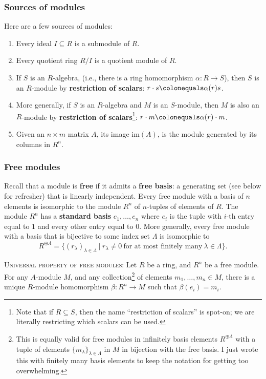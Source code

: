 \documentclass[12pt]{amsart}
\newcommand{\0}{$\phantom{.}$}
\newcommand{\1}{\mathbbm{1}}
\newcommand\ceq{\colonequals}
\newcommand{\sssec}[1]{\subsubsection*{#1}}
\begin{document}
\vspace{-1.5mm}

\sssec{Sources of modules} Here are a few sources of modules:
\begin{enumerate}
\item Every ideal $I\subseteq R$ is a submodule of $R$.
\item Every quotient ring $R/I$ is a quotient module of $R$.
\item If $S$ is an $R$-algebra, (i.e., there is a ring homomorphism $\alpha: R\to S$), then $S$ is an $R$-module by \textbf{restriction of scalars}:
$r \cdot s \ceq \alpha(r) s$.
\item More generally, if $S$ is an $R$-algebra and $M$ is an $S$-module, then $M$ is also an $R$-module by \textbf{restriction of scalars}\footnote{Note that if $R\subseteq S$, then the name ``restriction of scalars''
is spot-on; we are literally restricting which scalars can be used.}: $r \cdot m \ceq \alpha(r) \cdot m$.
\item Given an $n\times m$ matrix $A$, its image $\mathrm{im}(A)$, is the module generated by its columns in $R^n$.
\end{enumerate}



\sssec{Free modules} Recall that a module is \textbf{free} if it admits a \textbf{free basis}: a generating set (see below for refresher) that is linearly independent. Every free module with a basis of $n$ elements is isomorphic to the module $R^n$ of $n$-tuples of elements of $R$. The module $R^n$ has a \textbf{standard basis} $e_1,\dots,e_n$ where $e_i$ is the tuple with $i$-th entry equal to $1$ and every other entry equal to $0$. More generally, every free module with a basis that is bijective to some index set $\Lambda$ is isomorphic to 
\[ R^{\oplus \Lambda} = \{ (r_\lambda)_{\lambda\in\Lambda} \ | \ r_\lambda\neq 0 \ \text{for at most finitely many} \ \lambda\in\Lambda\}.\]

\noindent \textsc{Universal property of free modules:} Let $R$ be a ring, and $R^n$ be a free module. For any \mbox{$A$-module} $M$, and any collection\footnote{This is equally valid for free modules in infinitely basis elements $R^{\oplus \Lambda}$ with a tuple of elements $\{m_\lambda\}_{\lambda\in \Lambda}$ in $M$ in bijection with the free basis. I just wrote this with finitely many basis elements to keep the notation for getting too overwhelming.}  of elements $m_1,\dots,m_n\in M$, there is a unique $R$-module homomorphism ${\beta: R^n\to M}$ such that $\beta(e_i)= m_i$.
\end{document}
